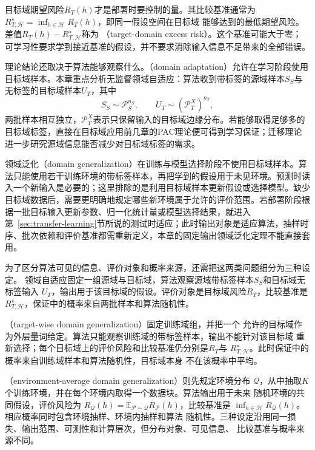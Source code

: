 目标域期望风险$R_T(h)$才是部署时要控制的量。其比较基准通常为
$R_{T,\mathcal H}^{\star}=\inf_{h\in\mathcal H}R_T(h)$，即同一假设空间在目标域
能够达到的最低期望风险。差值$R_T(h)-R_{T,\mathcal H}^{\star}$称为
（target-domain excess risk）。这个基准可能大于零；
可学习性要求学到接近基准的假设，并不要求消除输入信息不足带来的全部错误。

理论结论还取决于算法能够观察什么。（domain adaptation）允许在学习阶段使用目标域样本。本章重点分析无监督领域自适应：算法收到带标签的源域样本$S_S$与无标签的目标域样本$U_T$，其中
\[
 S_S\sim\mathcal P_S^{n_S},\qquad
 U_T\sim(\mathcal P_T^X)^{n_T},
\]
两批样本相互独立，$\mathcal P_T^X$表示只保留输入的目标域边缘分布。若能够取得足够多的目标域标签，直接在目标域应用前几章的PAC理论便可得到学习保证；迁移理论进一步研究源域信息能否减少对目标域标签的需求。

领域泛化（domain generalization）在训练与模型选择阶段不使用目标域样本。算法只能使用若干训练环境的带标签样本，再把学到的假设用于未见环境。预测时读入一个新输入是必要的；这里排除的是利用目标域样本更新假设或选择模型。缺少目标域数据后，需要更明确地规定哪些新环境属于允许的评价范围。若部署阶段根据一批目标输入更新参数、归一化统计量或模型选择结果，就进入第~\ref{sec:transfer-learning}节所说的测试时适应；此时输出对象是适应算法，抽样时序、批次依赖和评价基准都需重新定义，本章的固定输出领域泛化定理不能直接套用。

为了区分算法可见的信息、评价对象和概率来源，还需把这两类问题细分为三种设定。
领域自适应固定一组源域与目标域，算法观察源域带标签样本$S_S$和目标域无标签输入
$U_T$，输出用于该目标域的假设。评价对象是目标域风险$R_T$，比较基准是
$R_{T,\mathcal H}^{\star}$，保证中的概率来自两批样本和算法随机性。

（target-wise domain generalization）固定训练域组，并把一个
允许的目标域作为外层量词给定。算法只能观察训练域的带标签样本，输出不能针对该目标域
重新选择；每个目标域上的评价风险和比较基准仍分别是$R_T$与
$R_{T,\mathcal H}^{\star}$。此时保证中的概率来自训练域样本和算法随机性，目标域本身
不在该概率中平均。

（environment-average domain generalization）则先规定环境分布
$\mathcal Q$，从中抽取$K$个训练环境，并在每个环境内取得一个数据块。算法输出用于未来
随机环境的共同假设，评价风险为
$R_{\mathcal Q}(h)=\mathbb E_{\mathcal P\sim\mathcal Q}R_{\mathcal P}(h)$，比较基准是
$\inf_{h\in\mathcal H}R_{\mathcal Q}(h)$。相应概率同时包含环境抽样、环境内抽样和算法
随机性。三种设定沿用同一损失、输出范围、可测性和计算层次，但分布对象、可见信息、
比较基准与概率来源不同。

